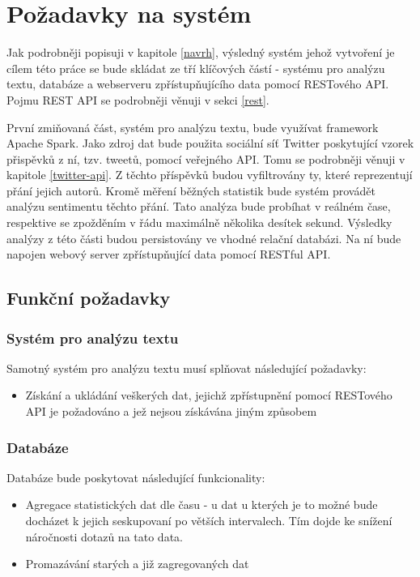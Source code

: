 \documentclass[thesis=B,czech]{FITthesis}[2012/06/26]
\begin{document}
\section{Požadavky na systém}
	Jak podrobněji popisuji v kapitole \ref{navrh}, výsledný systém jehož vytvoření je cílem této práce se bude skládat ze tří klíčových částí - systému pro analýzu textu, databáze a webserveru zpřístupňujícího data pomocí RESTového API. Pojmu REST API se podrobněji věnuji v sekci \ref{rest}. 
	
	 První zmiňovaná část, systém pro analýzu textu, bude využívat framework Apache Spark. Jako zdroj dat bude použita sociální síť Twitter poskytující vzorek přispěvků z ní, tzv. tweetů, pomocí veřejného API. Tomu se podrobněji věnuji v kapitole \ref{twitter-api}. Z těchto příspěvků budou vyfiltrovány ty, které reprezentují přání jejich autorů. Kromě měření běžných statistik bude systém provádět analýzu sentimentu těchto přání. Tato analýza bude probíhat v reálném čase, respektive se zpožděním v řádu maximálně několika desítek sekund.  Výsledky analýzy z této části budou persistovány ve vhodné relační databázi. Na ní bude napojen webový server zpřístupňující data pomocí RESTful API. 

\subsection{Funkční požadavky}
\label{pozadavky}
\subsubsection{Systém pro analýzu textu}
Samotný systém pro analýzu textu musí splňovat následující požadavky:
\begin{itemize}
\item Získání a ukládání veškerých dat, jejichž zpřístupnění pomocí RESTového API je požadováno a jež nejsou získávána jiným způsobem
\end{itemize}
\subsubsection{Databáze}
 Databáze bude poskytovat následující funkcionality:
\begin{itemize}
\item Agregace statistických dat dle času - u dat u kterých je to možné bude docházet k jejich seskupovaní po větších intervalech. Tím dojde ke snížení náročnosti dotazů na tato data. 
\item Promazávání starých a již zagregovaných dat
\end{itemize}
\end{document}
